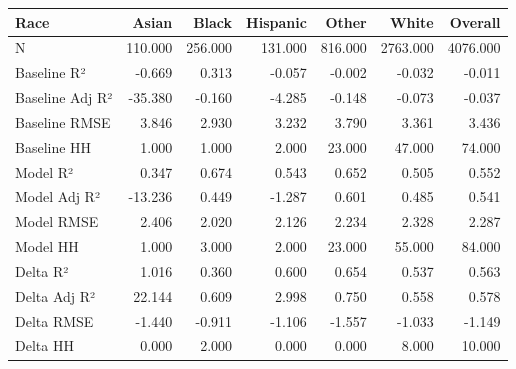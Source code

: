 \begin{tabular}{lrrrrrr}
\toprule
Race &   Asian &   Black &  Hispanic &   Other &    White &  Overall \\
\midrule
N               & 110.000 & 256.000 &   131.000 & 816.000 & 2763.000 & 4076.000 \\
Baseline R²     &  -0.669 &   0.313 &    -0.057 &  -0.002 &   -0.032 &   -0.011 \\
Baseline Adj R² & -35.380 &  -0.160 &    -4.285 &  -0.148 &   -0.073 &   -0.037 \\
Baseline RMSE   &   3.846 &   2.930 &     3.232 &   3.790 &    3.361 &    3.436 \\
Baseline HH     &   1.000 &   1.000 &     2.000 &  23.000 &   47.000 &   74.000 \\
Model R²        &   0.347 &   0.674 &     0.543 &   0.652 &    0.505 &    0.552 \\
Model Adj R²    & -13.236 &   0.449 &    -1.287 &   0.601 &    0.485 &    0.541 \\
Model RMSE      &   2.406 &   2.020 &     2.126 &   2.234 &    2.328 &    2.287 \\
Model HH        &   1.000 &   3.000 &     2.000 &  23.000 &   55.000 &   84.000 \\
Delta R²        &   1.016 &   0.360 &     0.600 &   0.654 &    0.537 &    0.563 \\
Delta Adj R²    &  22.144 &   0.609 &     2.998 &   0.750 &    0.558 &    0.578 \\
Delta RMSE      &  -1.440 &  -0.911 &    -1.106 &  -1.557 &   -1.033 &   -1.149 \\
Delta HH        &   0.000 &   2.000 &     0.000 &   0.000 &    8.000 &   10.000 \\
\bottomrule
\end{tabular}
